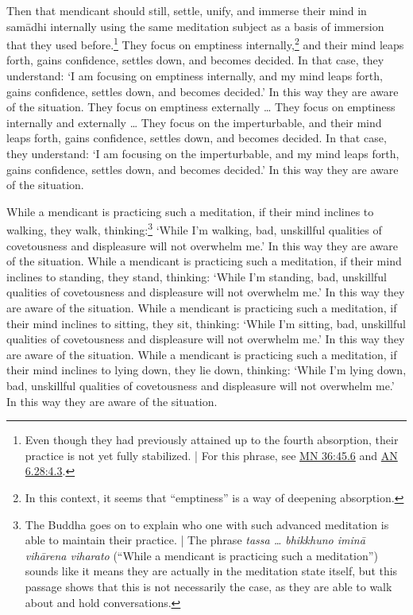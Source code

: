 \documentclass[12pt,openany]{book}%
\begin{document}
Then that mendicant should still, settle, unify, and immerse their mind in \textsanskrit{samādhi} internally using the same meditation subject as a basis of immersion that they used before.\footnote{Even though they had previously attained up to the fourth absorption, their practice is not yet fully stabilized. | For this phrase, see \href{https://suttacentral.net/mn36/en/sujato\#45.6}{MN 36:45.6} and \href{https://suttacentral.net/an6.28/en/sujato\#4.3}{AN 6.28:4.3}. } They focus on emptiness internally,\footnote{In this context, it seems that “emptiness” is a way of deepening absorption. } and their mind leaps forth, gains confidence, settles down, and becomes decided. In that case, they understand: ‘I am focusing on emptiness internally, and my mind leaps forth, gains confidence, settles down, and becomes decided.’ In this way they are aware of the situation. They focus on emptiness externally … They focus on emptiness internally and externally … They focus on the imperturbable, and their mind leaps forth, gains confidence, settles down, and becomes decided. In that case, they understand: ‘I am focusing on the imperturbable, and my mind leaps forth, gains confidence, settles down, and becomes decided.’ In this way they are aware of the situation. 

While a mendicant is practicing such a meditation, if their mind inclines to walking, they walk, thinking:\footnote{The Buddha goes on to explain who one with such advanced meditation is able to maintain their practice. | The phrase \textit{tassa … bhikkhuno \textsanskrit{iminā} \textsanskrit{vihārena} viharato} (“While a mendicant is practicing such a meditation”) sounds like it means they are actually in the meditation state itself, but this passage shows that this is not necessarily the case, as they are able to walk about and hold conversations. } ‘While I’m walking, bad, unskillful qualities of covetousness and displeasure will not overwhelm me.’ In this way they are aware of the situation. While a mendicant is practicing such a meditation, if their mind inclines to standing, they stand, thinking: ‘While I’m standing, bad, unskillful qualities of covetousness and displeasure will not overwhelm me.’ In this way they are aware of the situation. While a mendicant is practicing such a meditation, if their mind inclines to sitting, they sit, thinking: ‘While I’m sitting, bad, unskillful qualities of covetousness and displeasure will not overwhelm me.’ In this way they are aware of the situation. While a mendicant is practicing such a meditation, if their mind inclines to lying down, they lie down, thinking: ‘While I’m lying down, bad, unskillful qualities of covetousness and displeasure will not overwhelm me.’ In this way they are aware of the situation. 
\end{document}
